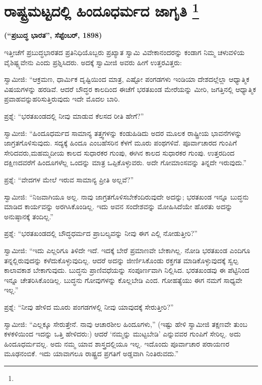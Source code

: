 
\chapter[ರಾಷ್ಟ್ರಮಟ್ಟದಲ್ಲಿ ಹಿಂದೂಧರ್ಮದ ಜಾಗೃತಿ ]{ರಾಷ್ಟ್ರಮಟ್ಟದಲ್ಲಿ ಹಿಂದೂಧರ್ಮದ ಜಾಗೃತಿ \protect\footnote{}}

\centerline{\textbf{(“ಪ್ರಬುದ್ಧ ಭಾರತ”, ಸೆಪ್ಟೆಂಬರ್​, 1898)}}

ಇತ್ತೀಚೆಗೆ ಪ್ರಬುದ್ಧಭಾರತದ ಪ್ರತಿನಿಧಿಯೊಬ್ಬರು ಪ್ರಖ್ಯಾತ ಸ್ವಾಮಿ ವಿವೇಕಾನಂದರನ್ನು ಕಂಡಾಗ ನಿಮ್ಮ ಚಳುವಳಿಯ ವೈಶಿಷ್ಟ್ಯವೇನು ಎಂದು ಪ್ರಶ್ನಿಸಿದರು. ಅದಕ್ಕೆ ಸ್ವಾಮೀಜಿ ಅವರು ಹೀಗೆ ಉತ್ತರವಿತ್ತರು:

ಸ್ವಾಮೀಜಿ: “ಆಕ್ರಮಣ, ಧಾರ್ಮಿಕ ದೃಷ್ಟಿಯಿಂದ ಮಾತ್ರ, ಎಷ್ಟೋ ಪಂಗಡಗಳು ಇಂಡಿಯಾ ದೇಶದಲ್ಲೆಲ್ಲಾ ಆಧ್ಯಾತ್ಮಿಕ ವಿಷಯಗಳನ್ನು ಹರಡಿವೆ. ಆದರೆ ಬೌದ್ಧರ ಕಾಲದಿಂದ ಈಚೆಗೆ ಭರತಖಂಡ ಮೇರೆಯನ್ನು ಮೀರಿ, ಜಗತ್ತಿನಲ್ಲಿ ಆಧ್ಯಾತ್ಮಿಕ ಪ್ರವಾಹವನ್ನು\break ಹರಿಸುತ್ತಿರುವುದು ಇದೇ ಮೊದಲ ಬಾರಿ.

ಪ್ರಶ್ನೆ: “ಭರತಖಂಡದಲ್ಲಿ ನೀವು ಮಾಡುವ ಕೆಲಸದ ರೀತಿ ಹೇಗೆ?”

ಸ್ವಾಮೀಜಿ: “ಹಿಂದೂಧರ್ಮದ ಸಾಮಾನ್ಯ ತತ್ತ್ವಗಳನ್ನು ಕಂಡುಹಿಡಿದು ಅದರ ಮೂಲಕ ರಾಷ್ಟ್ರೀಯ ಭಾವನೆಗಳನ್ನು ಜಾಗ್ರತಗೊಳಿಸುವುದು. ಸದ್ಯಕ್ಕೆ ಹಿಂದೂ ಎಂಬ\break ಹೆಸರಿನ ಕೆಳಗೆ ಮೂರು ಪಂಥಗಳಿವೆ. ಪೂರ್ವಾಚಾರದ ಗುಂಪಿಗೆ ಸೇರಿದವರು,\break ಮಹಮ್ಮದೀಯ ಕಾಲದ ಸುಧಾರಕರ ಗುಂಪು, ಈಗಿನ ಕಾಲದ ಸುಧಾರಕರ ಗುಂಪು. ಉತ್ತರದಿಂದ ದಕ್ಷಿಣದವರೆಗೆ ಹಿಂದೂಗಳೆಲ್ಲ ಒಂದನ್ನು ಮಾತ್ರ ಒಪ್ಪಿಕೊಳ್ಳುವರು. ಅದೇ ಗೋಮಾಂಸವನ್ನು ತಿನ್ನದೇ ಇರುವುದು.”

ಪ್ರಶ್ನೆ: “ವೇದಗಳ ಮೇಲೆ ಇರುವ ಸಾಮಾನ್ಯ ಪ್ರೀತಿ ಅಲ್ಲವೆ?”

ಸ್ವಾಮೀಜಿ: “ನಿಜವಾಗಿಯೂ ಅಲ್ಲ. ನಾವು ಜಾಗ್ರತಗೊಳಿಸಬೇಕೆಂದಿರುವುದೇ ಅದನ್ನು; ಭರತಖಂಡ ಇನ್ನೂ ಬುದ್ಧನು ಮಾಡಿದ ಕಾರ್ಯವನ್ನು ಅರಗಿಸಿಕೊಂಡಿಲ್ಲ. ಇದು ಅವನ ಸಂದೇಶವನ್ನು ಮೋಹಿಸಿದೆಯೇ ಹೊರತು ಅದನ್ನು ಅನುಷ್ಠಾನಕ್ಕೆ ತಂದಿಲ್ಲ.”

\vskip 5pt

ಪ್ರಶ್ನೆ: “ಭರತಖಂಡದಲ್ಲಿ ಬೌದ್ಧಧರ್ಮದ ಪ್ರಾಬಲ್ಯವನ್ನು ನೀವು ಈಗ ಎಲ್ಲಿ ನೋಡುತ್ತೀರಿ?”

\vskip 5pt

ಸ್ವಾಮೀಜಿ: “ಇದು ಎಲ್ಲರಿಗೂ ತಿಳಿದೇ ಇದೆ. ಇದಕ್ಕೆ ಬೇರೆ ಪ್ರಮಾಣವೇ ಬೇಕಾಗಿಲ್ಲ. ನೋಡಿ ಭರತಖಂಡ ಎಂದಿಗೂ ತನ್ನಲ್ಲಿರುವುದನ್ನು ಕಳೆದುಕೊಳ್ಳುವುದಿಲ್ಲ. ಆದರೆ ಅದನ್ನು ಜೀರ್ಣಿಸಿಕೊಂಡು ರಕ್ತಗತ ಮಾಡಿಕೊಳ್ಳುವುದಕ್ಕೆ ಸ್ವಲ್ಪ ಕಾಲಾವಕಾಶ ಬೇಕಾಗುವುದು. ಬುದ್ಧನು ಪ್ರಾಣಿವಧೆಯನ್ನು ಸಂಪೂರ್ಣವಾಗಿ ನಿಲ್ಲಿಸಿದ. ಭರತಖಂಡವು ಈ ಪೆಟ್ಟಿನಿಂದ ಇನ್ನೂ ಚೇತರಿಸಿಕೊಂಡಿಲ್ಲ. ಬುದ್ಧನು ಗೋವುಗಳನ್ನು ಕೊಲ್ಲಬೇಡಿ ಎಂದ. ಗೋಹತ್ಯೆಯು ಈಗ ನಮಗೆ ಸಾಧ್ಯವೇ ಇಲ್ಲ.”

\vskip 5pt

ಪ್ರಶ್ನೆ: “ನೀವು ಹೇಳಿದ ಮೂರು ಪಂಗಡಗಳಲ್ಲಿ ನೀವು ಯಾವುದಕ್ಕೆ ಸೇರುತ್ತೀರಿ?”

\vskip 5pt

ಸ್ವಾಮೀಜಿ: “ಎಲ್ಲಕ್ಕೂ ಸೇರುತ್ತೇನೆ. ನಾವು ಆಚಾರಶೀಲ ಹಿಂದೂಗಳು,” (ಇಷ್ಟು ಹೇಳಿ ಸ್ವಾಮೀಜಿ ತಕ್ಷಣವೇ ತುಂಬ ಕಳಕಳಿಯಿಂದ ಇದನ್ನು ಒತ್ತಿ ಹೇಳಿದರು:) ಆದರೆ ‘ನಮ್ಮನ್ನು ಮುಟ್ಟಬೇಡಿ’ ಎನ್ನುವವರ ಗುಂಪಿಗೆ ಸೇರಿಲ್ಲ. ಅದು ಹಿಂದೂಧರ್ಮವಲ್ಲ. ಅದು ನಮ್ಮ ಯಾವ ಶಾಸ್ತ್ರದಲ್ಲಿಯೂ ಇಲ್ಲ. ಇದೊಂದು ಪೂರ್ವಾಚಾರ ಪರಾಯಣರ ಮೂಢನಂಬಿಕೆ. ಇದು ಯಾವಾಗಲೂ ರಾಷ್ಟ್ರದ ಪ್ರಗತಿಗೆ ಅಡ್ಡವಾಗಿ ನಿಂತಿರುವದು.”

